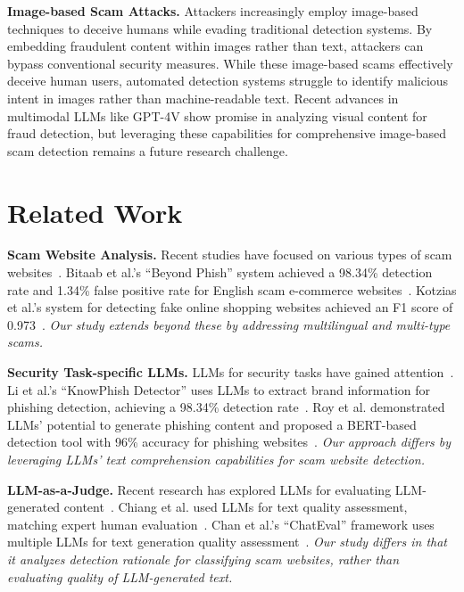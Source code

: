 \documentclass[runningheads]{llncs}
\begin{document}
\noindent\textbf{Image-based Scam Attacks.}
Attackers increasingly employ image-based techniques to deceive humans while evading traditional detection systems.
By embedding fraudulent content within images rather than text, attackers can bypass conventional security measures.
While these image-based scams effectively deceive human users, automated detection systems struggle to identify malicious intent in images rather than machine-readable text.
Recent advances in multimodal LLMs like GPT-4V show promise in analyzing visual content for fraud detection, but leveraging these capabilities for comprehensive image-based scam detection remains a future research challenge.

\section{Related Work}
\noindent\textbf{Scam Website Analysis.}
Recent studies have focused on various types of scam websites~\cite{DBLP:conf/ndss/MiramirkhaniSN17,DBLP:conf/ndss/LiYN23,DBLP:conf/www/SrinivasanKMANA18}.
Bitaab et al.'s ``Beyond Phish'' system achieved a 98.34\% detection rate and 1.34\% false positive rate for English scam e-commerce websites~\cite{DBLP:conf/sp/BitaabCOLWAWBSD23}.
Kotzias et al.'s system for detecting fake online shopping websites achieved an F1 score of 0.973~\cite{DBLP:conf/acsac/KotziasRPSB23}.
\textit{Our study extends beyond these by addressing multilingual and multi-type scams.}

\noindent\textbf{Security Task-specific LLMs.}
LLMs for security tasks have gained attention~\cite{alfasi2024unveiling,DBLP:journals/access/KoideNC24}.
Li et al.'s ``KnowPhish Detector'' uses LLMs to extract brand information for phishing detection, achieving a 98.34\% detection rate~\cite{DBLP:conf/uss/LiHDLCOLH24}.
Roy et al. demonstrated LLMs' potential to generate phishing content and proposed a BERT-based detection tool with 96\% accuracy for phishing websites~\cite{DBLP:journals/corr/abs-2310-19181}.
\textit{Our approach differs by leveraging LLMs' text comprehension capabilities for scam website detection.}

\noindent\textbf{LLM-as-a-Judge.}
Recent research has explored LLMs for evaluating LLM-generated content~\cite{DBLP:conf/nips/ZhengC00WZL0LXZ23,DBLP:conf/emnlp/SottanaLZY23}.
Chiang et al. used LLMs for text quality assessment, matching expert human evaluation~\cite{DBLP:conf/acl/ChiangL23}.
Chan et al.'s ``ChatEval'' framework uses multiple LLMs for text generation quality assessment~\cite{DBLP:journals/corr/abs-2308-07201}.
\textit{Our study differs in that it analyzes detection rationale for classifying scam websites, rather than evaluating quality of LLM-generated text.}
\end{document}
